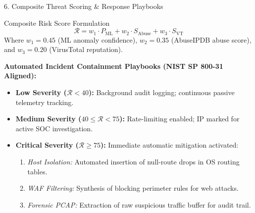 ﻿\documentclass[aspectratio=169, 10pt]{beamer}
\begin{document}
\begin{frame}{6. Composite Threat Scoring \& Response Playbooks}
    \begin{block}{Composite Risk Score Formulation}
        $$\mathcal{R} = w_1 \cdot P_{\text{ML}} + w_2 \cdot S_{\text{Abuse}} + w_3 \cdot S_{\text{VT}}$$
        \small Where $w_1 = 0.45$ (ML anomaly confidence), $w_2 = 0.35$ (AbuseIPDB abuse score), and $w_3 = 0.20$ (VirusTotal reputation).
    \end{block}

    \vspace{0.2cm}
    \textbf{Automated Incident Containment Playbooks (NIST SP 800-31 Aligned):}
    \begin{itemize}
        \item \textbf{Low Severity ($\mathcal{R} < 40$):} Background audit logging; continuous passive telemetry tracking.
        \item \textbf{Medium Severity ($40 \le \mathcal{R} < 75$):} Rate-limiting enabled; IP marked for active SOC investigation.
        \item \textbf{Critical Severity ($\mathcal{R} \ge 75$):} Immediate automatic mitigation activated:
        \begin{enumerate}
            \item \emph{Host Isolation:} Automated insertion of null-route drops in OS routing tables.
            \item \emph{WAF Filtering:} Synthesis of blocking perimeter rules for web attacks.
            \item \emph{Forensic PCAP:} Extraction of raw suspicious traffic buffer for audit trail.
        \end{enumerate}
    \end{itemize}
\end{frame}
\end{document}
